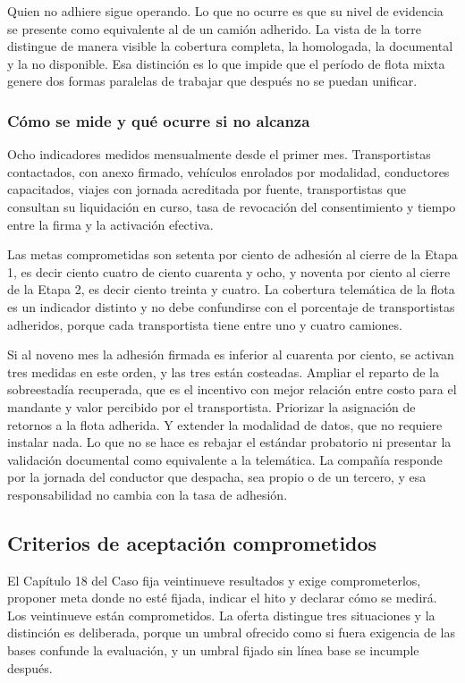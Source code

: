 Quien no adhiere sigue operando. Lo que no ocurre es que su nivel de evidencia se presente como
equivalente al de un camión adherido. La vista de la torre distingue de manera visible la cobertura
completa, la homologada, la documental y la no disponible. Esa distinción es lo que impide que el
período de flota mixta genere dos formas paralelas de trabajar que después no se puedan unificar.

\subsubsection{Cómo se mide y qué ocurre si no alcanza}

Ocho indicadores medidos mensualmente desde el primer mes. Transportistas contactados, con anexo
firmado, vehículos enrolados por modalidad, conductores capacitados, viajes con jornada acreditada
por fuente, transportistas que consultan su liquidación en curso, tasa de revocación del
consentimiento y tiempo entre la firma y la activación efectiva.

Las metas comprometidas son setenta por ciento de adhesión al cierre de la Etapa 1, es decir ciento
cuatro de ciento cuarenta y ocho, y noventa por ciento al cierre de la Etapa 2, es decir ciento
treinta y cuatro. La cobertura telemática de la flota es un indicador distinto y no debe
confundirse con el porcentaje de transportistas adheridos, porque cada transportista tiene entre
uno y cuatro camiones.

Si al noveno mes la adhesión firmada es inferior al cuarenta por ciento, se activan tres medidas en
este orden, y las tres están costeadas. Ampliar el reparto de la sobreestadía recuperada, que es el
incentivo con mejor relación entre costo para el mandante y valor percibido por el transportista.
Priorizar la asignación de retornos a la flota adherida. Y extender la modalidad de datos, que no
requiere instalar nada. Lo que no se hace es rebajar el estándar probatorio ni presentar la
validación documental como equivalente a la telemática. La compañía responde por la jornada del
conductor que despacha, sea propio o de un tercero, y esa responsabilidad no cambia con la tasa de
adhesión.

\subsection{Criterios de aceptación comprometidos}

El Capítulo 18 del Caso fija veintinueve resultados y exige comprometerlos, proponer meta donde no
esté fijada, indicar el hito y declarar cómo se medirá. Los veintinueve están comprometidos. La
oferta distingue tres situaciones y la distinción es deliberada, porque un umbral ofrecido como si
fuera exigencia de las bases confunde la evaluación, y un umbral fijado sin línea base se incumple
después.

